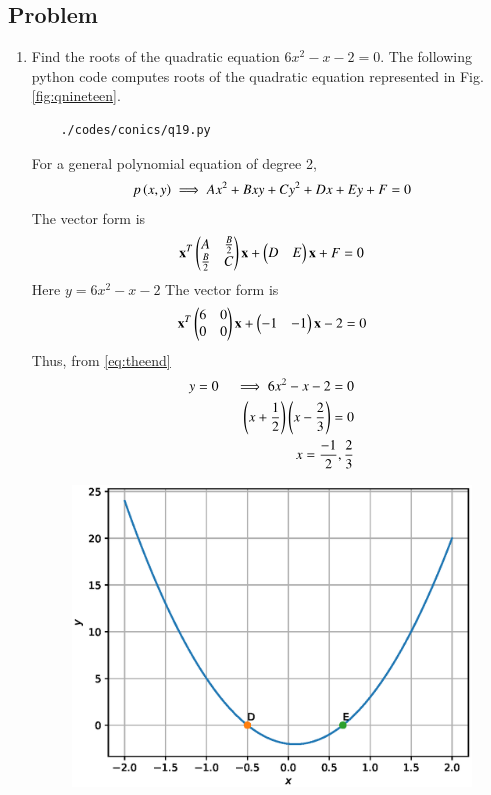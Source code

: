 \subsection{Problem}

\renewcommand{\theequation}{\theenumi}
\begin{enumerate}[label=\thesection.\arabic*.,ref=\thesection.\theenumi]
	\item Find the roots of the quadratic equation $6x^2-x-2=0$.
	The following python code computes roots of the quadratic equation represented in Fig.\ref{fig:qnineteen}.
	\begin{lstlisting}
	./codes/conics/q19.py
	\end{lstlisting}
	
	\solution For a general polynomial equation of degree 2,
	\begin{align}
	p\left(x,y\right) \implies Ax^2 +Bxy + Cy^2 +Dx + Ey + F = 0
	\end{align}
	The vector form is
	\begin{align}
	\mathbf{x}^T\begin{pmatrix}A&\frac{B}{2}\\\frac{B}{2}&C\end{pmatrix}\mathbf{x}  + \begin{pmatrix}D&E\end{pmatrix}\mathbf{x} + F = 0 \label{eq:theend}
	\end{align}
	Here $y = 6x^2-x-2$ \quad The vector form is
	\begin{align}
	\mathbf{x}^T\begin{pmatrix}6&0\\0&0\end{pmatrix}\mathbf{x}  + \begin{pmatrix}-1&-1\end{pmatrix}\mathbf{x} -2 = 0
	\end{align}
	Thus, from \ref{eq:theend}
	\begin{align}
	y = 0 \quad \implies 6x^2-x-2 = 0
	\\
	\left(x+\frac{1}{2}\right)\left(x-\frac{2}{3}\right) = 0
	\\
	x = \frac{-1}{2},\frac{2}{3}
	\end{align}

	\begin{figure}[!ht]
	\centering
	\includegraphics[width=\columnwidth]{./figs/conics/q19.eps}

\end{figure}
\end{enumerate}
